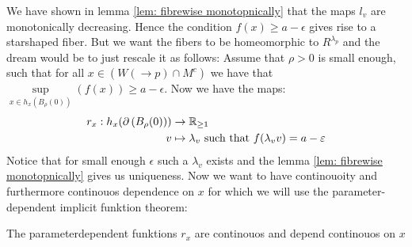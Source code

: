 We have shown in lemma \ref{lem: fibrewise monotopnically} that the maps $l_v$ are monotonically decreasing. Hence the condition $f(x)\geq a-\epsilon$ gives rise to a starshaped fiber. But we want the fibers to be homeomorphic to $R^{\lambda_p}$ and the dream would be to just rescale it as follows: 
Assume that $\rho>0$ is small enough, such that for all $x\in \left( W(\to p)\cap M^{c}\right) $ we have that $\sup\limits_{x\in h_x\left(B_{\rho}(0)\right)}(f(x))\geq a-\epsilon$. Now we have the maps: 
\begin{align*}
	r_x: h_x(\partial\left(B_{\rho}(0)\right))&\to \mathbb{R}_{\geq 1}\\
	v&\mapsto \lambda_v \text{ such that }f( \lambda_v v)=a-\varepsilon
\end{align*} Notice that for small enough $\epsilon$ such a $\lambda_v$ exists and the lemma \ref{lem: fibrewise monotopnically} gives us uniqueness. Now we want to have continouoity and furthermore continouos dependence on $x$ for which we will use the parameter-dependent implicit funktion theorem:
\begin{lemma}
	The parameterdependent funktions $r_x$ are continouos and depend continouos on $x$
\end{lemma}
